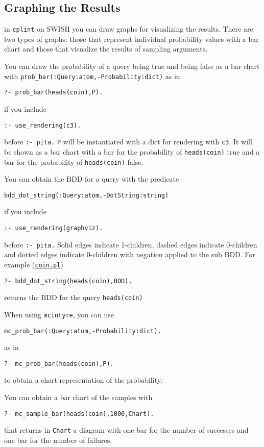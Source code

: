 \subsection{Graphing the Results}
\label{graphing}

in \texttt{cplint} on SWISH you can draw graphs
for visualizing the results. There are two types 
of graphs: those that represent individual probability values with a bar chart and those that 
visualize the results of sampling arguments.

You can draw the probability of a query being true and 
being false as a bar chart with \verb|prob_bar(:Query:atom,-Probability:dict)| as in
\begin{verbatim}
?- prob_bar(heads(coin),P).
\end{verbatim}
if you include
\begin{verbatim}
:- use_rendering(c3).
\end{verbatim}
before \verb|:- pita.| \verb|P| will be instantiated with a
dict for rendering with \verb|c3|. It will be shown as a bar chart with
a bar for the probability of \verb|heads(coin)| true and a bar for the probability of \verb|heads(coin)| false.

You can obtain the BDD for a query with the predicate
\begin{verbatim}
bdd_dot_string(:Query:atom,-DotString:string)
\end{verbatim}
if you include
\begin{verbatim}
:- use_rendering(graphviz).
\end{verbatim}
before \verb|:- pita.| 
Solid edges indicate 1-children, dashed edges indicate 0-children and dotted
edges indicate 0-children with negation applied to the sub BDD.
For example (\href{http://cplint.lamping.unife.it/example/inference/coin.pl}{\texttt{coin.pl}})
\begin{verbatim}
?- bdd_dot_string(heads(coin),BDD).
\end{verbatim}
returns the BDD for the query \verb|heads(coin)|

When using \verb|mcintyre|, you can use
\begin{verbatim}
mc_prob_bar(:Query:atom,-Probability:dict).
\end{verbatim}
as in
\begin{verbatim}
?- mc_prob_bar(heads(coin),P).
\end{verbatim}
to obtain a chart representation of the probability.

You can obtain a bar chart of the samples with
\begin{verbatim}
?- mc_sample_bar(heads(coin),1000,Chart).
\end{verbatim}
that returns in \verb|Chart| a diagram with one bar for the number of successes and 
one bar for the number of failures.

